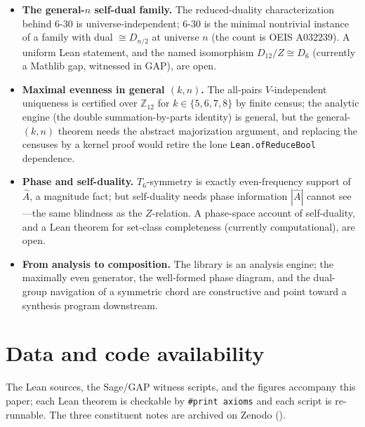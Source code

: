 \documentclass[11pt]{article}
\newcommand{\lean}[1]{\texttt{#1}}
\newcommand{\Ztwelve}{\mathbb{Z}_{12}}
\newcommand{\Dgrp}[1]{D_{#1}}
\newcommand{\Ahat}{\hat{A}}
\begin{document}
\begin{itemize}\itemsep2pt
  \item \textbf{The general-$n$ self-dual family.} The reduced-duality characterization behind
        $6$-$30$ is universe-independent; $6$-$30$ is the minimal nontrivial instance of a family
        with dual $\cong\Dgrp{n/2}$ at universe $n$ (the count is OEIS A032239). A uniform Lean
        statement, and the named isomorphism $\Dgrp{12}/Z\cong\Dgrp{6}$ (currently a Mathlib gap,
        witnessed in GAP), are open.
  \item \textbf{Maximal evenness in general $(k,n)$.} The all-pairs $V$-independent uniqueness is
        certified over $\Ztwelve$ for $k\in\{5,6,7,8\}$ by finite census; the analytic engine (the
        double summation-by-parts identity) is general, but the general-$(k,n)$ theorem needs the
        abstract majorization argument, and replacing the censuses by a kernel proof would retire
        the lone \lean{Lean.ofReduceBool} dependence.
  \item \textbf{Phase and self-duality.} $T_6$-symmetry is exactly even-frequency support of
        $\Ahat$, a magnitude fact; but self-duality needs phase information $|\Ahat|$ cannot
        see---the same blindness as the $Z$-relation. A phase-space account of self-duality, and a
        Lean theorem for set-class completeness (currently computational), are open.
  \item \textbf{From analysis to composition.} The library is an analysis engine; the maximally
        even generator, the well-formed phase diagram, and the dual-group navigation of a
        symmetric chord are constructive and point toward a synthesis program downstream.
\end{itemize}

\section*{Data and code availability}
The Lean sources, the Sage/GAP witness scripts, and the figures accompany this paper; each Lean
theorem is checkable by \lean{\#print axioms} and each script is re-runnable. The three
constituent notes are archived on Zenodo (\cite{Note1,Note2,Note3}).
\end{document}

